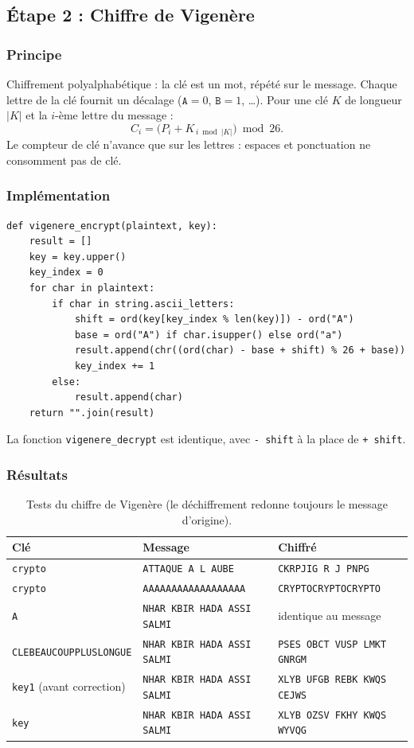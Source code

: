 \documentclass[11pt,a4paper]{article}
\begin{document}
\subsection{\'Etape 2 : Chiffre de Vigen\`ere}

\subsubsection{Principe}
Chiffrement polyalphab\'etique : la cl\'e est un mot, r\'ep\'et\'e sur le message. Chaque lettre
de la cl\'e fournit un d\'ecalage ($\texttt{A}=0$, $\texttt{B}=1$, \dots). Pour une cl\'e
$K$ de longueur $|K|$ et la $i$-\`eme lettre du message :
\[
  C_i = \bigl(P_i + K_{\,i \bmod |K|}\bigr) \bmod 26 .
\]
Le compteur de cl\'e n'avance que sur les lettres : espaces et ponctuation ne consomment pas de cl\'e.

\subsubsection{Impl\'ementation}
\begin{lstlisting}
def vigenere_encrypt(plaintext, key):
    result = []
    key = key.upper()
    key_index = 0
    for char in plaintext:
        if char in string.ascii_letters:
            shift = ord(key[key_index % len(key)]) - ord("A")
            base = ord("A") if char.isupper() else ord("a")
            result.append(chr((ord(char) - base + shift) % 26 + base))
            key_index += 1
        else:
            result.append(char)
    return "".join(result)
\end{lstlisting}
La fonction \texttt{vigenere\_decrypt} est identique, avec \texttt{- shift} \`a la place de \texttt{+ shift}.

\subsubsection{R\'esultats}
\begin{table}[H]
  \centering
  \small
  \begin{tabularx}{\linewidth}{@{}l l X@{}}
    \toprule
    \textbf{Cl\'e} & \textbf{Message} & \textbf{Chiffr\'e}\\
    \midrule
    \texttt{crypto} & \texttt{ATTAQUE A L AUBE} & \texttt{CKRPJIG R J PNPG}\\
    \texttt{crypto} & \texttt{AAAAAAAAAAAAAAAAAA} & \texttt{CRYPTOCRYPTOCRYPTO}\\
    \texttt{A} & \texttt{NHAR KBIR HADA ASSI SALMI} & identique au message\\
    \texttt{CLEBEAUCOUPPLUSLONGUE} & \texttt{NHAR KBIR HADA ASSI SALMI} & \texttt{PSES OBCT VUSP LMKT GNRGM}\\
    \texttt{key1} (avant correction) & \texttt{NHAR KBIR HADA ASSI SALMI} & \texttt{XLYB UFGB REBK KWQS CEJWS}\\
    \texttt{key} & \texttt{NHAR KBIR HADA ASSI SALMI} & \texttt{XLYB OZSV FKHY KWQS WYVQG}\\
    \bottomrule
  \end{tabularx}
  \caption{Tests du chiffre de Vigen\`ere (le d\'echiffrement redonne toujours le message d'origine).}
\end{table}
\end{document}
